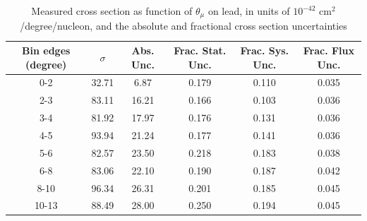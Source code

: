 \documentclass[../main.tex]{subfiles}
\begin{document}
\begin{table}
  \centering
  \renewcommand{\arraystretch}{1.15}
  \caption{Systematic covariance matrix of measured cross section in $p_{\mu}$ on lead, in units of $10^{-84}$ $(\text{cm}^2$/GeV/c/nucleon$)^2$}
  \label{tbl:sysnucleonnuc82muon_pc}
\end{table}
\pagebreak
\begin{turnpage}
\end{turnpage}
\begin{table}
  \centering
  \renewcommand{\arraystretch}{1.15}
  \caption{Measured cross section as function of $\theta_{\mu}$ on lead, in units of $10^{-42}$ $\text{cm}^2$/degree/nucleon, and the absolute and fractional cross section uncertainties}
    \begin{tabular}{c||c|c||c|c|c}
      Bin edges (degree) &  $\sigma$  &  Abs. Unc.  &  Frac. Stat. Unc.  &  Frac. Sys. Unc.  &  Frac. Flux Unc. \\
      \hline
      \hline
      0-2 & 32.71 & 6.87 & 0.179 & 0.110 & 0.035\\
      2-3 & 83.11 & 16.21 & 0.166 & 0.103 & 0.036\\
      3-4 & 81.92 & 17.97 & 0.176 & 0.131 & 0.036\\
      4-5 & 93.94 & 21.24 & 0.177 & 0.141 & 0.036\\
      5-6 & 82.57 & 23.50 & 0.218 & 0.183 & 0.038\\
      6-8 & 83.06 & 22.10 & 0.190 & 0.187 & 0.042\\
      8-10 & 96.34 & 26.31 & 0.201 & 0.185 & 0.045\\
      10-13 & 88.49 & 28.00 & 0.250 & 0.194 & 0.045
    \end{tabular}
  \label{tbl:datanucleonnuc82muon_thetaa}
\end{table}
\end{document}
